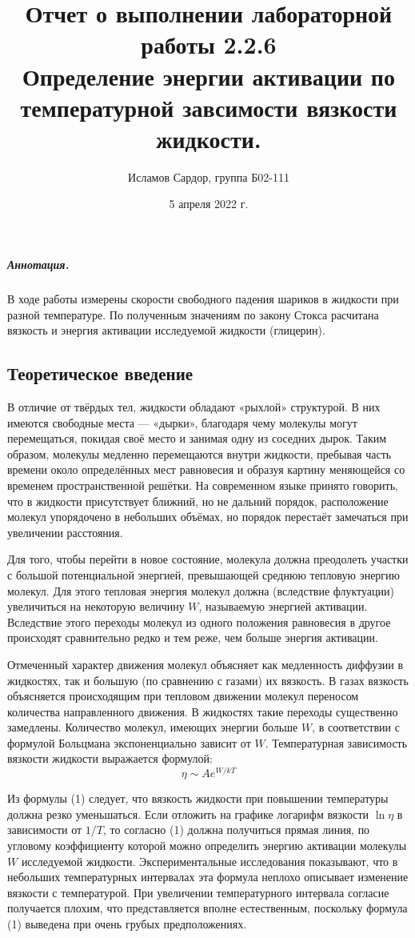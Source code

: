 \documentclass[12pt,a4paper]{article}
\title{
Отчет о выполнении лабораторной работы 2.2.6 \\
Определение энергии активации по температурной завсимости вязкости жидкости.}
\author{Исламов Сардор, группа Б02-111}
\date{5 апреля 2022 г.}
\begin{document}
\maketitle

\subparagraph*{Аннотация.} В ходе работы измерены скорости свободного падения шариков в жидкости при разной температуре.
По полученным значениям по закону Стокса расчитана вязкость и энергия активации исследуемой жидкости (глицерин).

\subsection*{Теоретическое введение}

В отличие от твёрдых тел, жидкости обладают «рыхлой» структурой. 
В них имеются свободные места — «дырки», благодаря чему молекулы могут перемещаться, покидая своё место и занимая одну из соседних дырок. 
Таким образом, молекулы медленно перемещаются внутри жидкости, пребывая часть времени около определённых мест равновесия и образуя картину меняющейся со временем пространственной решётки. 
На современном языке принято говорить, что в жидкости присутствует ближний, но не дальний порядок, расположение молекул упорядочено в небольших объёмах, но порядок перестаёт замечаться при увеличении расстояния.


Для того, чтобы перейти в новое состояние, молекула должна преодолеть участки с большой потенциальной энергией, превышающей среднюю тепловую энергию молекул. 
Для этого тепловая энергия молекул должна (вследствие флуктуации) увеличиться на некоторую величину $W$, называемую энергией активации. 
Вследствие этого переходы молекул из одного положения равновесия в другое происходят сравнительно редко и тем реже, чем больше энергия активации.

Отмеченный характер движения молекул объясняет как медленность диффузии в жидкостях, так и большую (по сравнению с газами) их вязкость. 
В газах вязкость объясняется происходящим при тепловом движении молекул переносом количества направленного движения. 
В жидкостях такие переходы существенно замедлены. 
Количество молекул, имеющих энергии больше $W$, в соответствии с формулой Больцмана экспоненциально зависит от $W$. 
Температурная зависимость вязкости жидкости выражается формулой:
\begin{equation}
    \eta \sim Ae^{W/kT}
\end{equation}

Из формулы (1) следует, что вязкость жидкости при повышении температуры должна резко уменьшаться. 
Если отложить на графике логарифм вязкости $\ln \eta$ в зависимости от $1/T$, то согласно (1) должна получиться прямая линия, по угловому коэффициенту которой можно определить энергию активации молекулы $W$ исследуемой жидкости. 
Экспериментальные исследования показывают, что в небольших температурных интервалах эта формула неплохо описывает изменение вязкости с температурой. 
При увеличении температурного интервала согласие получается плохим, что представляется вполне естественным, поскольку формула (1) выведена при очень грубых предположениях.
\end{document}
